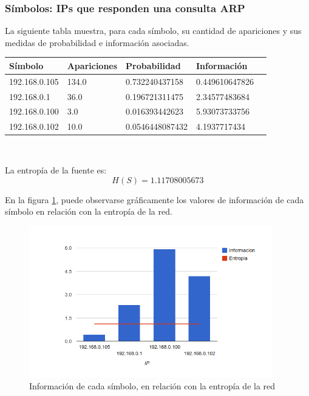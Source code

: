 \documentclass{article}
\begin{document}
\newpage

\subsubsection{Símbolos: IPs que responden una consulta ARP}
La siguiente tabla muestra, para cada símbolo, su cantidad de apariciones y
sus medidas de probabilidad e información asociadas.

\vskip10pt

\begin{tabular}{|l|l|l|l|l|}
  \hline
  Símbolo & Apariciones & Probabilidad & Información \\
  \hline
  192.168.0.105 & 134.0 & 0.732240437158 & 0.449610647826\\
\hline
192.168.0.1 & 36.0 & 0.196721311475 & 2.34577483684\\
\hline
192.168.0.100 & 3.0 & 0.016393442623 & 5.93073733756\\
\hline
192.168.0.102 & 10.0 & 0.0546448087432 & 4.1937717434\\
\hline
\end{tabular}\\

\vskip10pt

La entropía de la fuente es:
$$H(S) = 1.11708005673$$

En la figura \ref{fig:red2repliers:infoentro}, puede observarse gráficamente
los valores de información de cada símbolo en relación con la entropía de la
red.

\begin{figure}[h!]
    \centering                                                       
    \includegraphics[width=300pt]{red2/respuestas2.png}
    \caption{Información de cada símbolo, en relación con la
        entropía de la red}
    \label{fig:red2repliers:infoentro}
\end{figure}
\end{document}
